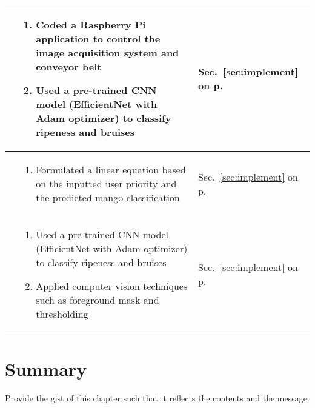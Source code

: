 \begin{center}
{\begin{tabularx}{\textwidth}{p{}|p{}|p{}}
			\Paste{SO3} & \begin{enumerate}
				\item Coded a Raspberry Pi application to control the image acquisition system and conveyor belt
				\item Used a pre-trained CNN model (EfficientNet with Adam optimizer) to classify ripeness and bruises
			\end{enumerate} & Sec.~\ref{sec:implement} on p.~\pageref{sec:implement} \\ \hline
			
			\Paste{SO4} & \begin{enumerate}
				\item Formulated a linear equation based on the inputted user priority and the predicted mango classification
			\end{enumerate} & Sec.~\ref{sec:implement} on p.~\pageref{sec:implement} \\ \hline
			
			\Paste{SO5} & \begin{enumerate}
				\item Used a pre-trained CNN model (EfficientNet with Adam optimizer) to classify ripeness and bruises
				\item Applied computer vision techniques such as foreground mask and thresholding
			\end{enumerate} & Sec.~\ref{sec:implement} on p.~\pageref{sec:implement} \\ \hline
			
		\end{tabularx}
	}
\end{center}



\section{Summary}

Provide the gist of this chapter such that it reflects the contents and the message.